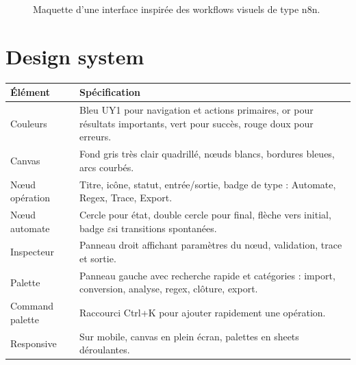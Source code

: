 \documentclass[11pt,a4paper]{report}
\newcommand{\eps}{\ensuremath{\varepsilon}}
\begin{document}
\begin{figure}[H]
{}
\caption{Maquette d'une interface inspirée des workflows visuels de type n8n.}
\end{figure}

\section{Design system}
\begin{longtable}{p{}p{}}
\toprule
\textbf{Élément} & \textbf{Spécification}\\
\midrule
Couleurs & Bleu UY1 pour navigation et actions primaires, or pour résultats importants, vert pour succès, rouge doux pour erreurs.\\
Canvas & Fond gris très clair quadrillé, nœuds blancs, bordures bleues, arcs courbés.\\
Nœud opération & Titre, icône, statut, entrée/sortie, badge de type : Automate, Regex, Trace, Export.\\
Nœud automate & Cercle pour état, double cercle pour final, flèche vers initial, badge \eps si transitions spontanées.\\
Inspecteur & Panneau droit affichant paramètres du nœud, validation, trace et sortie.\\
Palette & Panneau gauche avec recherche rapide et catégories : import, conversion, analyse, regex, clôture, export.\\
Command palette & Raccourci Ctrl+K pour ajouter rapidement une opération.\\
Responsive & Sur mobile, canvas en plein écran, palettes en sheets déroulantes.\\
\bottomrule
\end{longtable}
\end{document}
